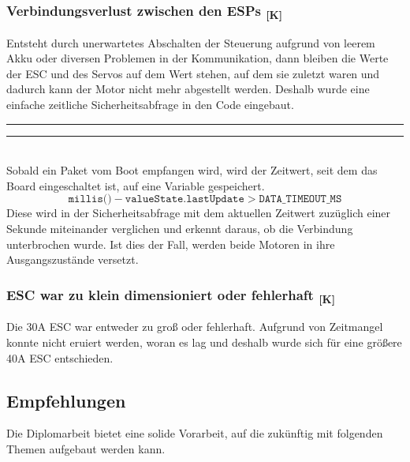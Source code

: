 \documentclass[a4paper,12pt]{article}
\begin{document}
\subsubsection{\texorpdfstring{Verbindungsverlust zwischen den ESPs \textsubscript{[K]}}{Verbindungsverlust zwischen den ESPs [K]}}
Entsteht durch unerwartetes Abschalten der Steuerung aufgrund von leerem Akku oder diversen Problemen in der Kommunikation, dann bleiben die Werte der ESC und des Servos auf dem Wert stehen, auf dem sie zuletzt waren und dadurch kann der Motor nicht mehr abgestellt werden. Deshalb wurde eine einfache zeitliche Sicherheitsabfrage in den Code eingebaut. 
\newline\noindent\rule{\linewidth}{0.4pt}  %

\noindent\rule{\linewidth}{0.4pt}\\[0.5em]  %

Sobald ein Paket vom Boot empfangen wird, wird der Zeitwert, seit dem das Board eingeschaltet ist, auf eine Variable gespeichert. 
\begin{equation}
\texttt{millis()} - \texttt{valueState.lastUpdate} > \texttt{DATA\_TIMEOUT\_MS}
\end{equation}
Diese wird in der Sicherheitsabfrage mit dem aktuellen Zeitwert zuzüglich einer Sekunde miteinander verglichen und erkennt daraus, ob die Verbindung unterbrochen wurde. Ist dies der Fall, werden beide Motoren in ihre Ausgangszustände versetzt.


\subsubsection{\texorpdfstring{ESC war zu klein dimensioniert oder fehlerhaft \textsubscript{[K]}}{ESC war zu klein dimensioniert oder fehlerhaft [K]}}

Die 30A ESC war entweder zu groß oder fehlerhaft. Aufgrund von Zeitmangel konnte nicht eruiert werden, woran es lag und deshalb wurde sich für eine größere 40A ESC entschieden.

\subsection{Empfehlungen}

Die Diplomarbeit bietet eine solide Vorarbeit, auf die zukünftig mit folgenden Themen aufgebaut werden kann.
\end{document}

